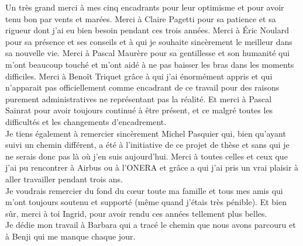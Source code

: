 \documentclass[main.tex]{subfiles}
\begin{document}
Un très grand merci à mes cinq encadrants pour leur optimisme et pour avoir tenu bon par vents et marées. Merci à Claire Pagetti pour sa patience et sa rigueur dont j'ai eu bien besoin pendant ces trois années. Merci à Éric Noulard pour sa présence et ses conseils et à qui je souhaite sincèrement le meilleur dans sa nouvelle vie. Merci à Pascal Maurère pour sa gentillesse et son humanité qui m'ont beaucoup touché et m'ont aidé à ne pas baisser les bras dans les moments difficiles. Merci à Benoît Triquet grâce à qui j'ai énormément appris et qui n'apparait pas officiellement comme encadrant de ce travail pour des raisons purement administratives ne représentant pas la réalité. Et merci à Pascal Sainrat pour avoir toujours continué à être présent, et ce malgré toutes les difficultés et les changements d'encadrement. \\

Je tiens également à remercier sincèrement Michel Pasquier qui, bien qu'ayant suivi un chemin différent, a été à l'initiative de ce projet de thèse et sans qui je ne serais donc pas là où j'en suis aujourd'hui. Merci à toutes celles et ceux que j'ai pu rencontrer à Airbus ou à l'ONERA et grâce a qui j'ai pris un vrai plaisir à aller travailler pendant trois ans. \\

Je voudrais remercier du fond du cœur toute ma famille et tous mes amis qui m'ont toujours soutenu et supporté (même quand j'étais très pénible). Et bien sûr, merci à toi Ingrid, pour avoir rendu ces années tellement plus belles.\\

Je dédie mon travail à Barbara qui a tracé le chemin que nous avons parcouru et à Benji qui me manque chaque jour.

\cleardoublepage
\end{document}
